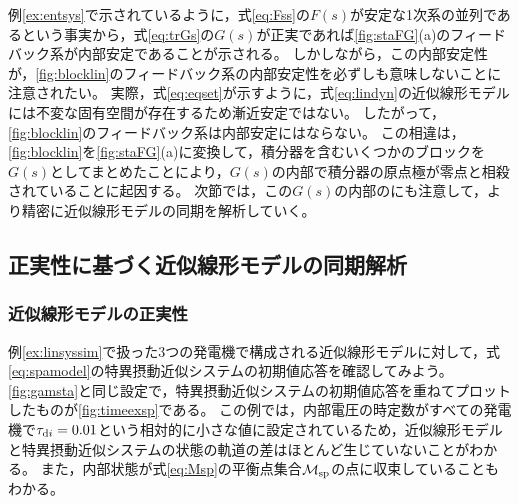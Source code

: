 \documentclass[tombow,dvipdfmx]{corona-a5}
\begin{document}
例\ref{ex:entsys}で示されているように，式\ref{eq:Fss}の$F(s)$が安定な1次系の並列であるという事実から，式\ref{eq:trGs}の$G(s)$が正実であれば\ref{fig:staFG}(a)のフィードバック系が内部安定であることが示される。
しかしながら，この内部安定性が，\ref{fig:blocklin}のフィードバック系の内部安定性を必ずしも意味しないことに注意されたい。
実際，式\ref{eq:eqset}が示すように，式\ref{eq:lindyn}の近似線形モデルには不変な固有空間が存在するため漸近安定ではない。
したがって，\ref{fig:blocklin}のフィードバック系は内部安定にはならない。
この相違は，\ref{fig:blocklin}を\ref{fig:staFG}(a)に変換して，積分器を含むいくつかのブロックを$G(s)$としてまとめたことにより，$G(s)$の内部で積分器の原点極が零点と相殺されていることに起因する。
次節では，この$G(s)$の内部のにも注意して，より精密に近似線形モデルの同期を解析していく。

\subsection{正実性に基づく近似線形モデルの同期解析\advanced}\label{sec:syncanp}


\subsubsection{近似線形モデルの正実性}






\begin{例}[特異摂動近似システムの初期値応答]
例\ref{ex:linsyssim}で扱った3つの発電機で構成される近似線形モデルに対して，式\ref{eq:spamodel}の特異摂動近似システムの初期値応答を確認してみよう。
\ref{fig:gamsta}と同じ設定で，特異摂動近似システムの初期値応答を重ねてプロットしたものが\ref{fig:timeexsp}である。
この例では，内部電圧の時定数がすべての発電機で$\tau_{{\rm d}i}=0.01$という相対的に小さな値に設定されているため，近似線形モデルと特異摂動近似システムの状態の軌道の差はほとんど生じていないことがわかる。
また，内部状態が式\ref{eq:Msp}の平衡点集合$\mathcal{M}_{\rm sp}$の点に収束していることもわかる。
\end{例}
\end{document}
